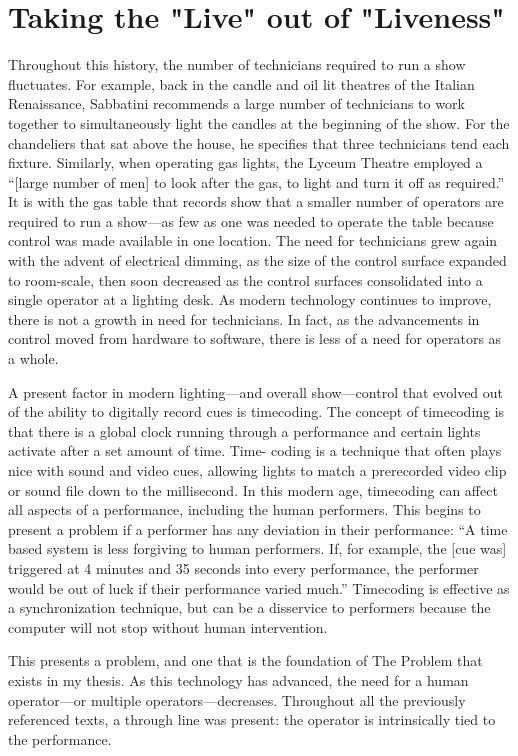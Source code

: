 \documentclass[
    12pt,
    twoside,
    bibstyle=chicago,
    headerstyle=uppercase,
	bibfile=thesis_updating.bib
]{reedthesis}
\begin{document}
\section{Taking the "Live" out of "Liveness"}
Throughout this history, the number of technicians required to run a show fluctuates. For example, back in the candle and oil lit theatres of the Italian Renaissance, Sabbatini recommends a large number of technicians to work together to simultaneously light the candles at the beginning of the show. For the chandeliers that sat above the house, he specifies that three technicians tend each fixture. Similarly, when operating gas lights, the Lyceum Theatre employed a “[large number of men] to look after the gas, to light and turn it off as required.” It is with the gas table that records show that a smaller number of operators are required to run a show---as few as one was needed to operate the table because control was made available in one location. The need for technicians grew again with the advent of electrical dimming, as the size of the control surface expanded to room-scale, then soon decreased as the control surfaces consolidated into a single operator at a lighting desk. As modern technology continues to improve, there is not a growth in need for technicians. In fact, as the advancements in control moved from hardware to software, there is less of a need for operators as a whole.

A present factor in modern lighting---and overall show---control that evolved out of the ability to digitally record cues is timecoding. The concept of timecoding is that there is a global clock running through a performance and certain lights activate after a set amount of time. Time- coding is a technique that often plays nice with sound and video cues, allowing lights to match a prerecorded video clip or sound file down to the millisecond. In this modern age, timecoding can affect all aspects of a performance, including the human performers. This begins to present a problem if a performer has any deviation in their performance: “A time based system is less forgiving to human performers. If, for example, the [cue was] triggered at 4 minutes and 35 seconds into every performance, the performer would be out of luck if their performance varied much.” Timecoding is effective as a synchronization technique, but can be a disservice to performers because the computer will not stop without human intervention. 

This presents a problem, and one that is the foundation of The Problem that exists in my thesis. As this technology has advanced, the need for a human operator---or multiple operators---decreases. Throughout all the previously referenced texts, a through line was present: the operator is intrinsically tied to the performance.
\end{document}

